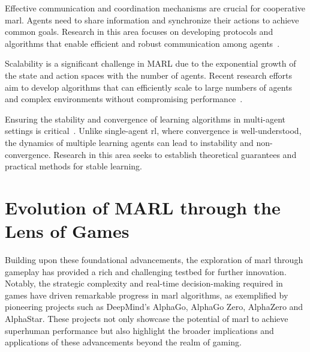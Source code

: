 Effective communication and coordination mechanisms are crucial for cooperative \gls{marl}. 
Agents need to share information and synchronize their actions to achieve common goals. 
Research in this area focuses on developing protocols and algorithms that enable efficient and 
robust communication among agents~\cite{sukhbaatar2016,fotouhi2019,hoang2023}.

Scalability is a significant challenge in MARL due to the exponential growth of the state and 
action spaces with the number of agents\cite{cao2012,busoniu2008}. 
Recent research efforts aim to develop algorithms that can efficiently scale to large numbers 
of agents and complex environments without compromising performance~\cite{smit2023,sun2023}.

Ensuring the stability and convergence of learning algorithms in multi-agent settings is 
critical~\cite{papoudakis2021}. 
Unlike single-agent \gls{rl}, where convergence is well-understood, 
the dynamics of multiple learning agents can lead to instability and non-convergence.
Research in this area seeks to establish theoretical guarantees and practical methods 
for stable learning.

\section{Evolution of MARL through the Lens of Games}

Building upon these foundational advancements, the exploration of 
\gls{marl} through gameplay has provided a rich and challenging testbed for further innovation. 
Notably, the strategic complexity and real-time decision-making required in games have driven 
remarkable progress in \gls{marl} algorithms, as exemplified by pioneering projects such as 
DeepMind's AlphaGo\cite{silver2016}, AlphaGo Zero\cite{silver2017},
AlphaZero\cite{silver2017a} and AlphaStar\cite{vinyals2019}. 
These projects not only showcase the potential of \gls{marl} to achieve superhuman performance 
but also highlight the broader implications and applications of these advancements 
beyond the realm of gaming.

